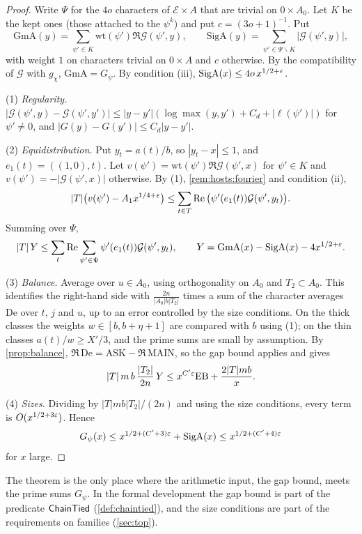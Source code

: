 \begin{proof}
Write $\Psi$ for the $4o$ characters of $\mathcal E\times A$ that are trivial on $0\times A_0$. Let $K$
be the kept ones (those attached to the $\psi^k$) and put $c=(3o+1)^{-1}$. Put
\[
\mathrm{GmA}(y)=\sum_{\psi'\in K}\mathrm{wt}(\psi')\Re\mathcal G(\psi',y),\qquad
\mathrm{SigA}(y)=\sum_{\psi'\in\Psi\smallsetminus K}|\mathcal G(\psi',y)|,
\]
with weight $1$ on characters trivial on $0\times A$ and $c$ otherwise. By the compatibility of
$\mathcal G$ with $g_\chi$, $\mathrm{GmA}=G_\psi$. By condition (iii), $\mathrm{SigA}(x)\le4o\,x^{1/2+\varepsilon}$.

(1) \emph{Regularity.} $|\mathcal G(\psi',y)-\mathcal G(\psi',y')|\le|y-y'|(\log\max(y,y')+C_d+|\ell(\psi')|)$
for $\psi'\ne0$, and $|G(y)-G(y')|\le C_d|y-y'|$.

(2) \emph{Equidistribution.} Put $y_t=a(t)/b$, so $|y_t-x|\le1$, and $e_1(t)=((1,0),t)$. Let
$v(\psi')=\mathrm{wt}(\psi')\Re\mathcal G(\psi',x)$ for $\psi'\in K$ and $v(\psi')=-|\mathcal G(\psi',x)|$
otherwise. By (1), \cref{rem:hosts:fourier} and condition (ii),
\[
|T|\big(v(\psi')-A_1x^{1/4+\varepsilon}\big)\le\sum_{t\in T}\operatorname{Re}\big(\psi'(e_1(t))\mathcal G(\psi',y_t)\big).
\]
Summing over $\Psi$,
\[
|T|\,Y\le\sum_t\operatorname{Re}\sum_{\psi'\in\Psi}\psi'(e_1(t))\mathcal G(\psi',y_t),\qquad
Y=\mathrm{GmA}(x)-\mathrm{SigA}(x)-4x^{1/2+\varepsilon}.
\]

(3) \emph{Balance.} Average over $u\in A_0$, using orthogonality on $A_0$ and $T_2\subset A_0$. This
identifies the right-hand side with $\frac{2n}{|A_0|b|T_2|}$ times a sum of the character averages
$\mathrm{De}$ over $t$, $j$ and $u$, up to an error controlled by the size conditions. On the thick
classes the weights $w\in[b,b+\eta+1]$ are compared with $b$ using (1); on the thin classes
$a(t)/w\ge X'/3$, and the prime sums are small by assumption. By \cref{prop:balance},
$\Re\,\mathrm{De}=\mathrm{ASK}-\Re\,\mathrm{MAIN}$, so the gap bound applies and gives
\[
|T|\,m\,b\,\frac{|T_2|}{2n}\,Y\le x^{C'\varepsilon}\mathrm{EB}+\frac{2|T|mb}x.
\]

(4) \emph{Sizes.} Dividing by $|T|mb|T_2|/(2n)$ and using the size conditions, every term is
$O(x^{1/2+3\varepsilon})$. Hence
\[
G_\psi(x)\le x^{1/2+(C'+3)\varepsilon}+\mathrm{SigA}(x)\le x^{1/2+(C'+4)\varepsilon}
\]
for $x$ large.
\end{proof}

The theorem is the only place where the arithmetic input, the gap bound, meets the prime sums $G_\psi$.
In the formal development the gap bound is part of the predicate $\mathsf{ChainTied}$
(\cref{def:chaintied}), and the size conditions are part of the requirements on families
(\cref{sec:top}).
